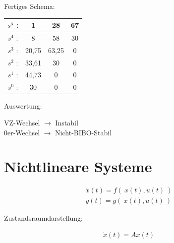 \documentclass[10pt,a4paper]{article}
\begin{document}
Fertiges Schema:
\begin{center}
\begin{tabular}{ |c|c|c|c| } 
 \hline
 $s^5$ : & 1     & 28   & 67\\ 
 \hline
 $s^4$ : & 8     & 58   & 30\\ 
 \hline
 $s^3$ : & 20,75 & 63,25& 0 \\ 
 \hline
 $s^2$ : & 33,61 & 30   & 0 \\ 
 \hline
 $s^1$ : & 44,73 & 0    & 0 \\ 
 \hline
 $s^0$ : & 30    & 0    & 0 \\ 
 \hline
\end{tabular}
\end{center}
Auswertung: 
  \begin{mdframed}[style=exercise]
    \begin{center}
      VZ-Wechsel $\rightarrow$ Instabil \\
      0er-Wechsel $\rightarrow$ Nicht-BIBO-Stabil
    \end{center}
  \end{mdframed}

  \section{Nichtlineare Systeme}
  \begin{mdframed}[style=exercise]
    \begin{align}
        \dot{x}(t) = f(\ x(t), u(t)\ ) \\
        y(t) = g(\ x(t), u(t)\ ) 
    \end{align}
  \end{mdframed}
Zustandsraumdarstellung:
  \begin{mdframed}[style=exercise]
    \begin{align}
        \dot{x}(t) = A x(t)
    \end{align}
  \end{mdframed}
\end{document}
